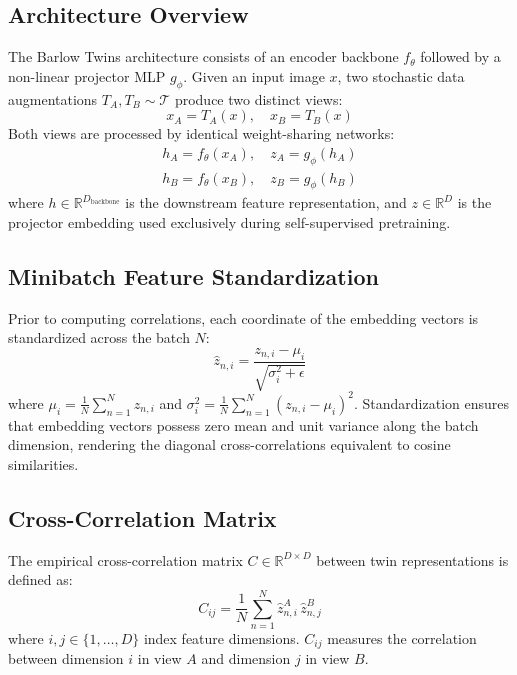 \documentclass[conference]{IEEEtran}
\begin{document}
\subsection{Architecture Overview}
The Barlow Twins architecture consists of an encoder backbone $f_\theta$ followed by a non-linear projector MLP $g_\phi$. Given an input image $x$, two stochastic data augmentations $T_A, T_B \sim \mathcal{T}$ produce two distinct views:
\begin{equation}
    x_A = T_A(x), \quad x_B = T_B(x)
\end{equation}
Both views are processed by identical weight-sharing networks:
\begin{align}
    h_A = f_\theta(x_A), \quad z_A = g_\phi(h_A) \\
    h_B = f_\theta(x_B), \quad z_B = g_\phi(h_B)
\end{align}
where $h \in \mathbb{R}^{D_{\text{backbone}}}$ is the downstream feature representation, and $z \in \mathbb{R}^D$ is the projector embedding used exclusively during self-supervised pretraining.

\subsection{Minibatch Feature Standardization}
Prior to computing correlations, each coordinate of the embedding vectors is standardized across the batch $N$:
\begin{equation}
    \hat{z}_{n, i} = \frac{z_{n, i} - \mu_i}{\sqrt{\sigma_i^2 + \epsilon}}
\end{equation}
where $\mu_i = \frac{1}{N} \sum_{n=1}^N z_{n, i}$ and $\sigma_i^2 = \frac{1}{N} \sum_{n=1}^N (z_{n, i} - \mu_i)^2$. Standardization ensures that embedding vectors possess zero mean and unit variance along the batch dimension, rendering the diagonal cross-correlations equivalent to cosine similarities.

\subsection{Cross-Correlation Matrix}
The empirical cross-correlation matrix $C \in \mathbb{R}^{D \times D}$ between twin representations is defined as:
\begin{equation}
    C_{ij} = \frac{1}{N} \sum_{n=1}^N \hat{z}_{n, i}^A \, \hat{z}_{n, j}^B
\end{equation}
where $i, j \in \{1, \dots, D\}$ index feature dimensions. $C_{ij}$ measures the correlation between dimension $i$ in view $A$ and dimension $j$ in view $B$.
\end{document}
